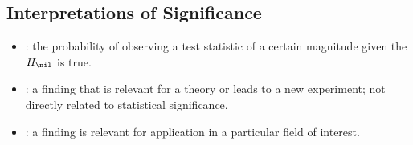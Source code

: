 \begin{itemize}
  \subsection{Interpretations of Significance}
  \begin{itemize}
    \item {}: the probability of observing a test statistic of a certain magnitude given the \(H_\nil\) is true.
    \item {}: a finding that is relevant for a theory or leads to a new experiment; not directly related to statistical significance. 
    \item {}: a finding is relevant for application in a particular field of interest. 
  \end{itemize}
\end{itemize}

